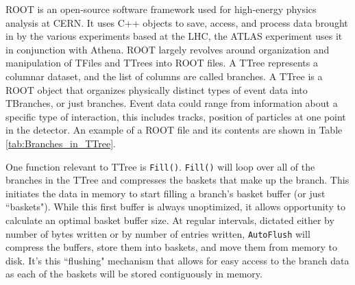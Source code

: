 ROOT is an open-source software framework used for high-energy physics analysis at CERN.\cite{ROOT_about} 
It uses C++ objects to save, access, and process data brought in by the various experiments based at the LHC, the ATLAS experiment uses it in conjunction with Athena.
ROOT largely revolves around organization and manipulation of TFiles and TTrees into ROOT files.
A TTree represents a columnar dataset, and the list of columns are called branches. 
A TTree is a ROOT object that organizes physically distinct types of event data into TBranches, or just branches.
Event data could range from information about a specific type of interaction, this includes tracks, position of particles at one point in the detector. 
An example of a ROOT file and its contents are shown in Table \ref{tab:Branches_in_TTree}. 

\begin{table}[!ht]
  \centering
  \vspace{20px}
  \caption{A snapshot of TBranches composing a TTree, from a PHYSLITE DAOD}
  \label{tab:Branches_in_TTree}
  \vspace{20px}
\end{table}

One function relevant to TTree is \verb|Fill()|. 
\verb|Fill()| will loop over all of the branches in the TTree and compresses the baskets that make up the branch.\cite{ROOT_TTree}
This initiates the data in memory to start filling a branch's basket buffer (or just ``baskets").
While this first buffer is always unoptimized, it allows opportunity to calculate an optimal basket buffer size.
At regular intervals, dictated either by number of bytes written or by number of entries written, \verb|AutoFlush| will compress the buffers, store them into baskets, and move them from memory to disk. 
It's this ``flushing" mechanism that allows for easy access to the branch data as each of the baskets will be stored contiguously in memory.

